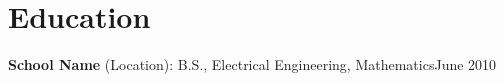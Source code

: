 
\section*{Education}


\textbf{School Name} (Location):
B.S., Electrical Engineering, Mathematics\hfill June 2010


